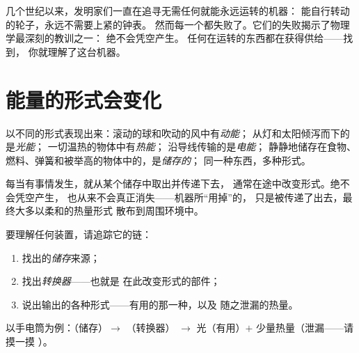 \begin{remark}\label{rem:g5:everyday-energy:nofree}
几个世纪以来，发明家们一直在追寻无需任何就能永远运转的机器：
能自行转动的轮子，永远不需要上紧的钟表。
然而每一个都失败了。它们的失败揭示了物理学最深刻的教训之一：
绝不会凭空产生。
任何在运转的东西都在获得供给——找到，
你就理解了这台机器。
\end{remark}

\section{能量的形式会变化}

\begin{example}[能量的形式]\label{ex:g5:everyday-energy:forms}
以不同的形式表现出来：滚动的球和吹动的风中有\emph{动能}；
从灯和太阳倾泻而下的是\emph{光能}；
一切温热的物体中有\emph{热能}；
沿导线传输的是\emph{电能}；
静静地储存在食物、燃料、弹簧和被举高的物体中的，是\emph{储存的}；
同一种东西，多种形式。
\end{example}

\begin{proposition}[能量链]\label{prop:g5:everyday-energy:chain}
每当有事情发生，就从某个储存中取出并传递下去，
通常在途中改变形式。绝不会凭空产生，
也从来不会真正消失——机器所“用掉”的，
只是被传递了出去，最终大多以柔和的热量形式
散布到周围环境中。
\end{proposition}

\begin{method}[阅读能量链]\label{met:g5:everyday-energy:read}
要理解任何装置，请追踪它的链：
\begin{enumerate}
  \item 找出的\emph{储存}来源；
  \item 找出\emph{转换器}——也就是
        在此改变形式的部件；
  \item 说出输出的各种形式——有用的那一种，以及
        随之泄漏的热量。
\end{enumerate}
以手电筒为例：（储存）$\to$ （转换器）
$\to$ 光（有用）$+$ 少量热量（泄漏——请摸一摸
）。
\end{method}

